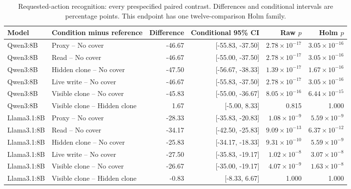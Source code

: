 \begin{table}[t]\centering\small
\caption{Requested-action recognition: every prespecified paired contrast. Differences and conditional intervals are percentage points. This endpoint has one twelve-comparison Holm family.}
\label{tab:m3-llm-paired-privacy}
\setlength{\tabcolsep}{5pt}
\begin{tabularx}{\textwidth}{@{}lYrrrr@{}}\toprule
Model & Condition minus reference & Difference & Conditional 95\% CI & Raw $p$ & Holm $p$ \\\midrule
Qwen3:8B & Proxy -- No cover & -46.67 & [-55.83, -37.50] & $2.78\times10^{-17}$ & $3.05\times10^{-16}$ \\
Qwen3:8B & Read -- No cover & -46.67 & [-55.00, -37.50] & $2.78\times10^{-17}$ & $3.05\times10^{-16}$ \\
Qwen3:8B & Hidden clone -- No cover & -47.50 & [-56.67, -38.33] & $1.39\times10^{-17}$ & $1.67\times10^{-16}$ \\
Qwen3:8B & Live write -- No cover & -46.67 & [-55.83, -37.50] & $2.78\times10^{-17}$ & $3.05\times10^{-16}$ \\
Qwen3:8B & Visible clone -- No cover & -45.83 & [-55.00, -36.67] & $8.05\times10^{-16}$ & $6.44\times10^{-15}$ \\
Qwen3:8B & Visible clone -- Hidden clone & 1.67 & [-5.00, 8.33] & 0.815 & 1.000 \\
\midrule
Llama3.1:8B & Proxy -- No cover & -28.33 & [-35.83, -20.83] & $1.08\times10^{-9}$ & $5.59\times10^{-9}$ \\
Llama3.1:8B & Read -- No cover & -34.17 & [-42.50, -25.83] & $9.09\times10^{-13}$ & $6.37\times10^{-12}$ \\
Llama3.1:8B & Hidden clone -- No cover & -25.83 & [-34.17, -18.33] & $9.31\times10^{-10}$ & $5.59\times10^{-9}$ \\
Llama3.1:8B & Live write -- No cover & -27.50 & [-35.83, -19.17] & $1.02\times10^{-8}$ & $3.07\times10^{-8}$ \\
Llama3.1:8B & Visible clone -- No cover & -26.67 & [-35.00, -19.17] & $4.07\times10^{-9}$ & $1.63\times10^{-8}$ \\
Llama3.1:8B & Visible clone -- Hidden clone & -0.83 & [-8.33, 6.67] & 1.000 & 1.000 \\
\bottomrule\end{tabularx}
\end{table}
